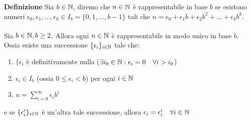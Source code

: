 \documentclass[a4paper,12pt]{article}
\begin{document}
{
	\textbf{Definizione} Sia $b \in \mathbb{N}$, diremo che $n \in \mathbb{N}$ è rappresentabile in base $b$ se esistono numeri $\epsilon_{0}, \epsilon_{1}, ..., \epsilon_{k} \in I_{b} = \{0, 1, ..., b-1\}$ tali che $n = \epsilon_{0} + \epsilon_{1}b + \epsilon_{2}b^{2} + ... + \epsilon_{k}b^{k}$.
	\\\\
	Sia $b \in \mathbb{N}, b \geq 2$. Allora ogni $n \in \mathbb{N}$ è rappresentabile in modo unico in base $b$. Ossia esiste una successione $\{\epsilon_{i}\}_{i \in \mathbb{N}}$ tale che:
	\begin{enumerate}
		\item $\{\epsilon_{i}$ è definitivamente nulla ($\exists i_{0} \in \mathbb{N} : \epsilon_{i} = 0 \quad \forall i > i_{0}$)
		\item $\epsilon_{i} \in I_{b}$ (ossia $0 \leq \epsilon_{i} < b$) per ogni $i \in \mathbb{N}$
		\item $n = \sum_{i = 0}^{\infty} \epsilon_{i}b^i$
	\end{enumerate}
	e se $\{\epsilon_{i}'\}_{i \in \mathbb{N}}$ è un'altra tale successione, allora $\epsilon_{i} = \epsilon_{i}' \quad \forall i \in \mathbb{N}$
}
\end{document}
